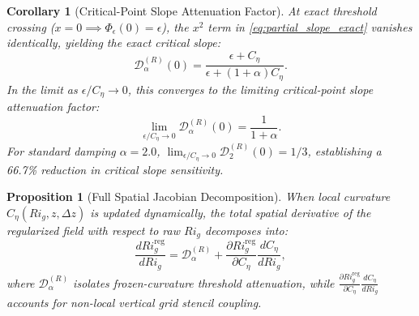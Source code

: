 \documentclass[11pt,a4paper]{article}
\newtheorem{proposition}{Proposition}
\newtheorem{corollary}{Corollary}
\begin{document}
\begin{corollary}[Critical-Point Slope Attenuation Factor]
At exact threshold crossing ($x = 0 \implies \Phi_\epsilon(0) = \epsilon$), the $x^2$ term in \cref{eq:partial_slope_exact} vanishes identically, yielding the exact critical slope:
\begin{equation}
\mathcal{D}_\alpha^{(R)}(0) = \frac{\epsilon + C_\eta}{\epsilon + (1+\alpha)C_\eta}.
\label{eq:critical_slope_exact}
\end{equation}
In the limit as $\epsilon / C_\eta \to 0$, this converges to the limiting critical-point slope attenuation factor:
\begin{equation}
\lim_{\epsilon/C_\eta \to 0} \mathcal{D}_\alpha^{(R)}(0) = \frac{1}{1 + \alpha}.
\label{eq:attenuation_bound}
\end{equation}
For standard damping $\alpha = 2.0$, $\lim_{\epsilon/C_\eta \to 0}\mathcal{D}_2^{(R)}(0) = 1/3$, establishing a 66.7\% reduction in critical slope sensitivity.
\end{corollary}

\begin{proposition}[Full Spatial Jacobian Decomposition]
When local curvature $C_\eta(Ri_g, z, \Delta z)$ is updated dynamically, the total spatial derivative of the regularized field with respect to raw $Ri_g$ decomposes into:
\begin{equation}
\frac{dRi_g^{\text{reg}}}{dRi_g} = \mathcal{D}_\alpha^{(R)} + \frac{\partial Ri_g^{\text{reg}}}{\partial C_\eta} \frac{dC_\eta}{dRi_g},
\label{eq:full_jacobian_decomp}
\end{equation}
where $\mathcal{D}_\alpha^{(R)}$ isolates frozen-curvature threshold attenuation, while $\frac{\partial Ri_g^{\text{reg}}}{\partial C_\eta} \frac{dC_\eta}{dRi_g}$ accounts for non-local vertical grid stencil coupling.
\end{proposition}
\end{document}
